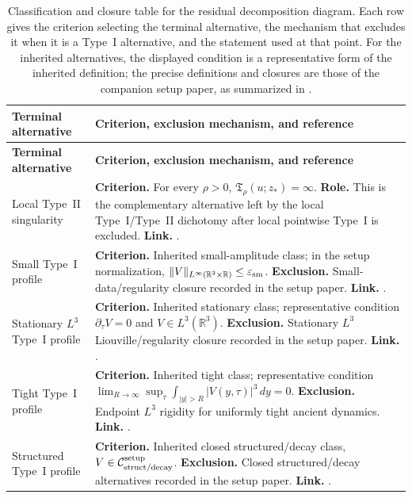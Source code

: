 \documentclass[11pt]{amsart}
\numberwithin{equation}{section}
\theoremstyle{plain}
\theoremstyle{definition}
\theoremstyle{remark}
\newcommand{\R}{\mathbb R}
\newcommand{\eps}{\varepsilon}
\begin{document}
\begingroup
\footnotesize
\setlength{\tabcolsep}{4pt}
\renewcommand{\arraystretch}{1.25}
\begin{longtable}{@{}L{1.20in}L{4.65in}@{}}
\caption{Classification and closure table for the residual decomposition diagram.  Each row gives
the criterion selecting the terminal alternative, the mechanism that excludes
it when it is a Type~I alternative, and the statement used at that point.
For the inherited alternatives, the displayed condition is a representative
form of the inherited definition; the precise definitions and closures are those
of the companion setup paper, as summarized in
.}
\label{tab:decision-tree-classification}\\
\hline
\textbf{Terminal alternative} & \textbf{Criterion, exclusion mechanism, and reference}\\
\hline
\endfirsthead
\hline
\textbf{Terminal alternative} & \textbf{Criterion, exclusion mechanism, and reference}\\
\hline
\endhead
\hline
\endfoot
Local Type~II singularity &
\textbf{Criterion.}  For every \(\rho>0\),
\(\mathfrak T_\rho(u;z_*)=\infty\).
\textbf{Role.}  This is the complementary alternative left by the local
Type~I/Type~II dichotomy after local pointwise Type~I is excluded.
\textbf{Link.}  .\\

Small Type~I profile &
\textbf{Criterion.}  Inherited small-amplitude class; in the setup normalization,
\(\|V\|_{L^\infty(\R^3\times\R)}\le\eps_{\rm sm}\).
\textbf{Exclusion.}  Small-data/regularity closure recorded in the setup
paper.
\textbf{Link.}  .\\

Stationary \(L^3\) Type~I profile &
\textbf{Criterion.}  Inherited stationary class; representative condition
\(\partial_\tau V=0\) and \(V\in L^3(\R^3)\).
\textbf{Exclusion.}  Stationary \(L^3\) Liouville/regularity closure recorded
in the setup paper.
\textbf{Link.}  .\\

Tight Type~I profile &
\textbf{Criterion.}  Inherited tight class; representative condition
\(\lim_{R\to\infty}\sup_\tau\int_{|y|>R}|V(y,\tau)|^3\,dy=0\).
\textbf{Exclusion.}  Endpoint \(L^3\) rigidity for uniformly tight ancient
dynamics.
\textbf{Link.}  .\\

Structured Type~I profile &
\textbf{Criterion.}  Inherited closed structured/decay class,
\(V\in\mathcal C_{\rm struct/decay}^{\rm setup}\).
\textbf{Exclusion.}  Closed structured/decay alternatives recorded in the
setup paper.
\textbf{Link.}  .\\


\end{longtable}
\end{document}
